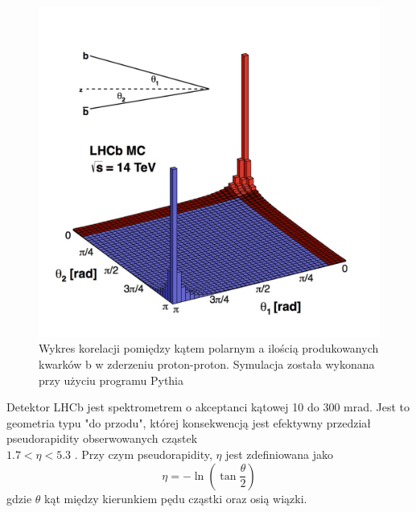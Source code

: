 \begin{figure}[h]
  \centering
  \includegraphics[scale=0.5]{rozdzial2/pythia.jpg}
  \caption{Wykres korelacji pomiędzy kątem polarnym a ilością produkowanych kwarków b w zderzeniu proton-proton. Symulacja została wykonana przy użyciu programu Pythia \cite{public}}
  \label{fig:pythia}
\end{figure}

Detektor LHCb jest spektrometrem o akceptanci kątowej 10 do 300 mrad. Jest to geometria typu "do przodu", której konsekwencją jest efektywny przedział pseudorapidity obserwowanych cząstek\\ $1.7<\eta < 5.3$ . Przy czym pseudorapidity, $\eta $ jest zdefiniowana jako
\begin{equation}
 \eta=-\ln\left(\tan\frac{\theta}{2}\right)
\end{equation}
gdzie $\theta$ kąt między kierunkiem pędu cząstki oraz osią wiązki.


